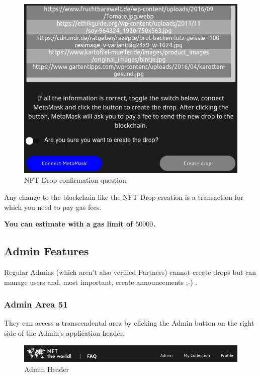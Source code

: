\documentclass[
]{article}
\begin{document}
\begin{figure}
\centering
\includegraphics{images/drop_creation_confirm_question.png}
\caption{NFT Drop confirmation question}
\end{figure}\newpage

Any change to the blockchain like the NFT Drop creation is a transaction
for which you need to pay gas fees.

\textbf{You can estimate with a gas limit of \(50000\).}

\hypertarget{admin-features}{%
\subsection{Admin Features}\label{admin-features}}

Regular Admins (which aren't also verified Partners) cannot create drops
but can manage users and, most important, create announcements ;-) .

\hypertarget{admin-area-51}{%
\subsubsection{Admin Area 51}\label{admin-area-51}}

They can access a transcendental area by clicking the Admin button on
the right side of the Admin's application header.

\begin{figure}
\centering
\includegraphics{images/admin_header.png}
\caption{Admin Header}
\end{figure}
\end{document}
